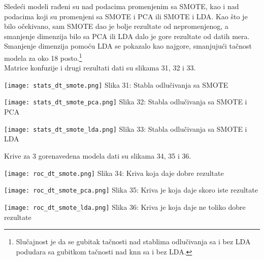 \documentclass[a4paper]{article}
\begin{document}
{Sledeći modeli rađeni su nad podacima promenjenim sa SMOTE, kao i nad podacima koji su promenjeni sa SMOTE i PCA ili SMOTE i LDA. Kao što je bilo očekivano, sam SMOTE dao je bolje rezultate od nepromenjenog, a smanjenje dimenzija bilo sa PCA ili LDA dalo je gore rezultate od datih mera. Smanjenje dimenzija pomoću LDA se pokazalo kao najgore, smanjujući tačnost modela za oko 18 posto.\footnote[4]{Slučajnost je da se gubitak tačnosti nad stablima odlučivanja sa i bez LDA podudara sa gubitkom tačnosti nad knn sa i bez LDA.}\\

Matrice konfuzije i drugi rezultati dati su slikama 31, 32 i 33.\\

\noindent\begin{minipage}{0.35\textwidth}
\texttt{[image: stats\_dt\_smote.png]}
\hphantom{}Slika 31: Stabla odlučivanja sa SMOTE\\
\end{minipage}
\noindent\begin{minipage}{0.01\textwidth}
\hphantom{a}
\end{minipage}
\begin{minipage}{0.35\textwidth}
\texttt{[image: stats\_dt\_smote\_pca.png]}
\hphantom{}Slika 32: Stabla odlučivanja sa SMOTE i PCA\\
\end{minipage}
\noindent\begin{minipage}{0.01\textwidth}
\hphantom{a}
\end{minipage}
\begin{minipage}{0.35\textwidth}
\texttt{[image: stats\_dt\_smote\_lda.png]}
\hphantom{}Slika 33: Stabla odlučivanja sa SMOTE i LDA\\
\end{minipage}

Krive za 3 gorenavedena modela dati su slikama 34, 35 i 36.\\

\noindent\begin{minipage}{0.35\textwidth}
\texttt{[image: roc\_dt\_smote.png]}
\hphantom{}Slika 34: Kriva koja daje dobre rezultate\\
\end{minipage}
\noindent\begin{minipage}{0.01\textwidth}
\hphantom{a}
\end{minipage}
\begin{minipage}{0.35\textwidth}
\texttt{[image: roc\_dt\_smote\_pca.png]}
\hphantom{}Slika 35: Kriva je koja daje skoro iste rezultate\\
\end{minipage}
\noindent\begin{minipage}{0.01\textwidth}
\hphantom{a}
\end{minipage}
\begin{minipage}{0.35\textwidth}
\texttt{[image: roc\_dt\_smote\_lda.png]}
\hphantom{}Slika 36: Kriva je koja daje ne toliko dobre rezultate\\
\end{minipage}

}
\end{document}
